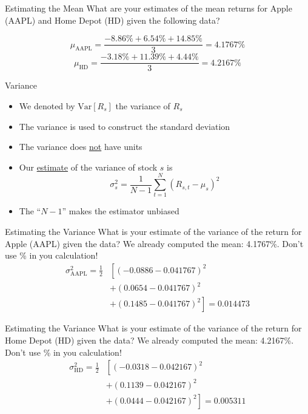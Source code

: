 \documentclass{beamer}
\begin{document}
\begin{frame}{Estimating the Mean}
	What are your estimates of the mean returns for Apple (AAPL) and Home Depot (HD) given the following data?
	\begin{center}
		
	\end{center}
	\pause
	{\color{blue}
	\begin{equation*}
		\mu_{\text{AAPL}}=\frac{-8.86\%+6.54\%+14.85\%}{3}=4.1767\%
	\end{equation*}
	}
	\pause
	{\color{blue}
	\begin{equation*}
		\mu_{\text{HD}}=\frac{-3.18\%+11.39\%+4.44\%}{3}=4.2167\%
	\end{equation*}
	}
\end{frame}

\begin{frame}{Variance}
	\begin{itemize}
		\item We denoted by $\text{Var}[R_{s}]$ the variance of $R_{s}$
		\item The variance is used to construct the standard deviation
		\item The variance does \underline{not} have units
		\item Our \underline{estimate} of the variance of stock $s$ is
		\begin{equation*}
			\sigma_{s}^{2}=\frac{1}{N-1}\sum_{t=1}^{N}{(R_{s,t}-\mu_{s})^{2}}
		\end{equation*}
		\item The ``$N-1$'' makes the estimator unbiased
	\end{itemize}
\end{frame}

\begin{frame}{Estimating the Variance}	
	What is your estimate of the variance of the return for Apple (AAPL) given the data?
	\pause
	{\color{blue}
	We already computed the mean: 4.1767\%. Don't use \% in you calculation! 
	\begin{align*}
		\sigma_{\text{AAPL}}^{2}=\frac{1}{2}&\left[(-0.0886-0.041767)^{2}\right.\\&\left.+(0.0654-0.041767)^{2}\right.\\&\left.+(0.1485-0.041767)^{2}\right]=0.014473
	\end{align*}
	}
\end{frame}
\begin{frame}{Estimating the Variance}	
	What is your estimate of the variance of the return for Home Depot (HD) given the data?
	\pause
	{\color{blue}
	We already computed the mean: 4.2167\%. Don't use \% in you calculation! 
	\begin{align*}
		\sigma_{\text{HD}}^{2}=\frac{1}{2}&\left[(-0.0318-0.042167)^{2}\right.\\&\left.+(0.1139-0.042167)^{2}\right.\\&\left.+(0.0444-0.042167)^{2}\right]=0.005311
	\end{align*}
	}
\end{frame}
\end{document}
